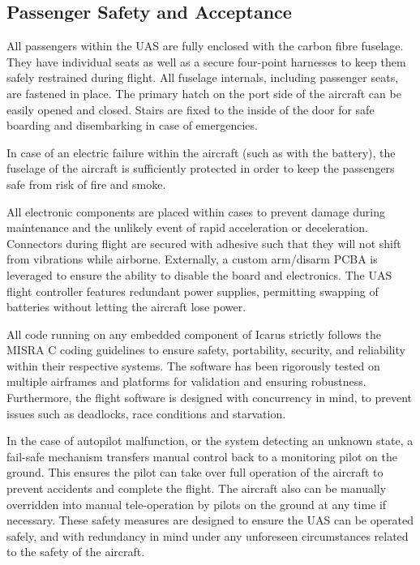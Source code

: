 \clearpage

\subsection{Passenger Safety and Acceptance}
\label{sec:safety}

All passengers within the UAS are fully enclosed with the carbon fibre
fuselage. They have individual seats as well as a secure four-point harnesses
to keep them safely restrained during flight. All fuselage internals, including
passenger seats, are fastened in place. The primary hatch on the port side of
the aircraft can be easily opened and closed. Stairs are fixed to the inside of
the door for safe boarding and disembarking in case of emergencies.

In case of an electric failure within the aircraft (such as with the battery),
the fuselage of the aircraft is sufficiently protected in order to keep the
passengers safe from risk of fire and smoke.

All electronic components are placed within cases to prevent damage during
maintenance and the unlikely event of rapid acceleration or deceleration.
Connectors during flight are secured with adhesive such that they will not
shift from vibrations while airborne. Externally, a custom arm/disarm PCBA is
leveraged to ensure the ability to disable the board and electronics. The UAS
flight controller features redundant power supplies, permitting swapping of
batteries without letting the aircraft lose power.

All code running on any embedded component of Icarus strictly follows the MISRA
C coding guidelines to ensure safety, portability, security, and reliability
within their respective systems. The software has been rigorously tested on
multiple airframes and platforms for validation and ensuring robustness.
Furthermore, the flight software is designed with concurrency in mind, to
prevent issues such as deadlocks, race conditions and starvation.

In the case of autopilot malfunction, or the system detecting an unknown state,
a fail-safe mechanism transfers manual control back to a monitoring pilot on
the ground. This ensures the pilot can take over full operation of the aircraft
to prevent accidents and complete the flight. The aircraft also can be manually
overridden into manual tele-operation by pilots on the ground at any time if
necessary. These safety measures are designed to ensure the UAS can be operated
safely, and with redundancy in mind under any unforeseen circumstances related
to the safety of the aircraft.
